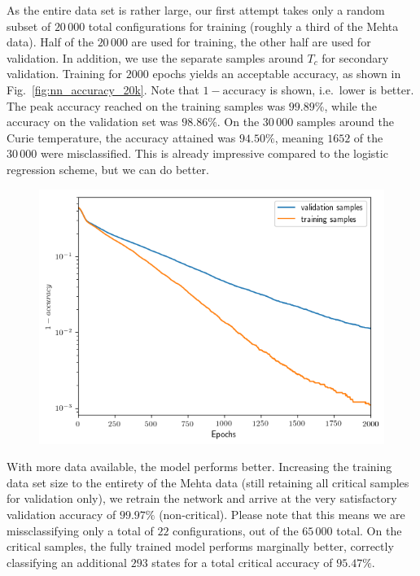 \documentclass[a4paper, twocolumn]{article}
\newcommand{\fig}[1]{Fig.\ \ref{fig:#1}}
\begin{document}
As the entire data set is rather large, our first attempt takes only a random subset of $20\,000$ total configurations for training (roughly a third of the Mehta data). Half of the $20\,000$ are used for training, the other half are used for validation. In addition, we use the separate samples around $T_c$ for secondary validation. Training for $2000$ epochs yields an acceptable accuracy, as shown in \fig{nn_accuracy_20k}. Note that $1-\text{accuracy}$ is shown, i.e.\ lower is better. The peak accuracy reached on the training samples was $99.89\%$, while the accuracy on the validation set was $98.86\%$. On the $30\,000$ samples around the Curie temperature, the accuracy attained was $94.50\%$, meaning $1652$ of the $30\,000$ were misclassified. This is already impressive compared to the logistic regression scheme, but we can do better.


\begin{figure}
\centering
 \includegraphics[width=\textwidth]{accuracy-20k.png}
\end{figure}

With more data available, the model performs better. Increasing the training data set size to the entirety of the Mehta data (still retaining all critical samples for validation only), we retrain the network and arrive at the very satisfactory validation accuracy of $99.97\%$ (non-critical). Please note that this means we are missclassifying only a total of $22$ configurations, out of the $65\,000$ total. On the critical samples, the fully trained model performs marginally better, correctly classifying an additional $293$ states for a total critical accuracy of $95.47\%$. 
\end{document}
